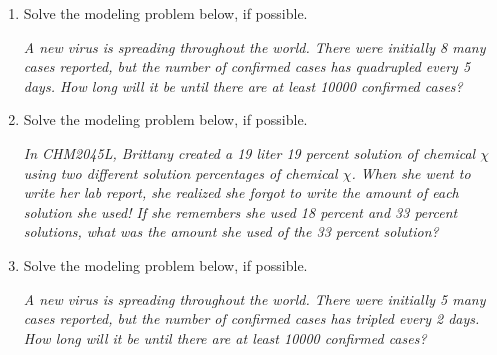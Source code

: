 \documentclass[14pt]{extbook}
\begin{document}
\begin{enumerate}
{\begin{center}
\end{center}
} \newpage
\item{
Solve the modeling problem below, if possible.
\begin{center}
    \textit{ A new virus is spreading throughout the world. There were initially 8 many cases reported, but the number of confirmed cases has quadrupled every 5 days. How long will it be until there are at least 10000 confirmed cases? }
\end{center}
} \newpage
\item{
Solve the modeling problem below, if possible.
\begin{center}
    \textit{ In CHM2045L, Brittany created a 19 liter 19 percent solution of chemical $\chi$ using two different solution percentages of chemical $\chi$. When she went to write her lab report, she realized she forgot to write the amount of each solution she used! If she remembers she used 18 percent and 33 percent solutions, what was the amount she used of the 33 percent solution? }
\end{center}
} \newpage
\item{
Solve the modeling problem below, if possible.
\begin{center}
    \textit{ A new virus is spreading throughout the world. There were initially 5 many cases reported, but the number of confirmed cases has tripled every 2 days. How long will it be until there are at least 10000 confirmed cases? }
\end{center}
} \newpage
\end{enumerate}
\end{document}
